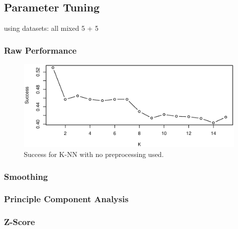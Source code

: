 \subsection{Parameter Tuning}

using datasets: all mixed 5 + 5

\subsubsection{Raw Performance}

\begin{figure}[H]
\centering
\includegraphics[width = 0.9 \textwidth]{graphics/knn_raw_success}
\caption{Success for K-NN with no preprocessing used.}
\end{figure}


\subsubsection{Smoothing}

\begin{figure}[H]
\centering
{}
\end{figure}


\subsubsection{Principle Component Analysis}

\begin{figure}[H]
\centering
{}
\end{figure}


\subsubsection{Z-Score}

\begin{figure}[H]
\centering
{}
\end{figure}


